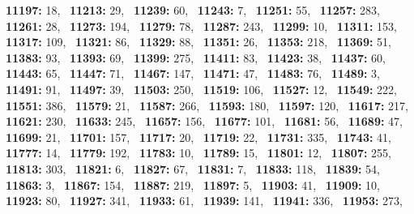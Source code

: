 \textbf{11197:} 18,\allowbreak~ 
\textbf{11213:} 29,\allowbreak~ 
\textbf{11239:} 60,\allowbreak~ 
\textbf{11243:} 7,\allowbreak~ 
\textbf{11251:} 55,\allowbreak~ 
\textbf{11257:} 283,\allowbreak~ 
\textbf{11261:} 28,\allowbreak~ 
\textbf{11273:} 194,\allowbreak~ 
\textbf{11279:} 78,\allowbreak~ 
\textbf{11287:} 243,\allowbreak~ 
\textbf{11299:} 10,\allowbreak~ 
\textbf{11311:} 153,\allowbreak~ 
\textbf{11317:} 109,\allowbreak~ 
\textbf{11321:} 86,\allowbreak~ 
\textbf{11329:} 88,\allowbreak~ 
\textbf{11351:} 26,\allowbreak~ 
\textbf{11353:} 218,\allowbreak~ 
\textbf{11369:} 51,\allowbreak~ 
\textbf{11383:} 93,\allowbreak~ 
\textbf{11393:} 69,\allowbreak~ 
\textbf{11399:} 275,\allowbreak~ 
\textbf{11411:} 83,\allowbreak~ 
\textbf{11423:} 38,\allowbreak~ 
\textbf{11437:} 60,\allowbreak~ 
\textbf{11443:} 65,\allowbreak~ 
\textbf{11447:} 71,\allowbreak~ 
\textbf{11467:} 147,\allowbreak~ 
\textbf{11471:} 47,\allowbreak~ 
\textbf{11483:} 76,\allowbreak~ 
\textbf{11489:} 3,\allowbreak~ 
\textbf{11491:} 91,\allowbreak~ 
\textbf{11497:} 39,\allowbreak~ 
\textbf{11503:} 250,\allowbreak~ 
\textbf{11519:} 106,\allowbreak~ 
\textbf{11527:} 12,\allowbreak~ 
\textbf{11549:} 222,\allowbreak~ 
\textbf{11551:} 386,\allowbreak~ 
\textbf{11579:} 21,\allowbreak~ 
\textbf{11587:} 266,\allowbreak~ 
\textbf{11593:} 180,\allowbreak~ 
\textbf{11597:} 120,\allowbreak~ 
\textbf{11617:} 217,\allowbreak~ 
\textbf{11621:} 230,\allowbreak~ 
\textbf{11633:} 245,\allowbreak~ 
\textbf{11657:} 156,\allowbreak~ 
\textbf{11677:} 101,\allowbreak~ 
\textbf{11681:} 56,\allowbreak~ 
\textbf{11689:} 47,\allowbreak~ 
\textbf{11699:} 21,\allowbreak~ 
\textbf{11701:} 157,\allowbreak~ 
\textbf{11717:} 20,\allowbreak~ 
\textbf{11719:} 22,\allowbreak~ 
\textbf{11731:} 335,\allowbreak~ 
\textbf{11743:} 41,\allowbreak~ 
\textbf{11777:} 14,\allowbreak~ 
\textbf{11779:} 192,\allowbreak~ 
\textbf{11783:} 10,\allowbreak~ 
\textbf{11789:} 15,\allowbreak~ 
\textbf{11801:} 12,\allowbreak~ 
\textbf{11807:} 255,\allowbreak~ 
\textbf{11813:} 303,\allowbreak~ 
\textbf{11821:} 6,\allowbreak~ 
\textbf{11827:} 67,\allowbreak~ 
\textbf{11831:} 7,\allowbreak~ 
\textbf{11833:} 118,\allowbreak~ 
\textbf{11839:} 54,\allowbreak~ 
\textbf{11863:} 3,\allowbreak~ 
\textbf{11867:} 154,\allowbreak~ 
\textbf{11887:} 219,\allowbreak~ 
\textbf{11897:} 5,\allowbreak~ 
\textbf{11903:} 41,\allowbreak~ 
\textbf{11909:} 10,\allowbreak~ 
\textbf{11923:} 80,\allowbreak~ 
\textbf{11927:} 341,\allowbreak~ 
\textbf{11933:} 61,\allowbreak~ 
\textbf{11939:} 141,\allowbreak~ 
\textbf{11941:} 336,\allowbreak~ 
\textbf{11953:} 273,\allowbreak~ 
